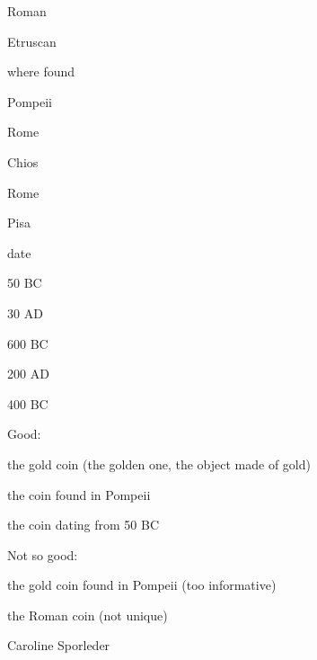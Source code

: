 \documentclass[compress,color=usenames]{beamer}
\begin{document}
\begin{frame}
Roman



Etruscan






where found



Pompeii



Rome



Chios



Rome



Pisa






date



50 BC



30 AD



600 BC



200 AD



400 BC






Good:



the gold coin (the golden one, the object made of gold)



the coin found in Pompeii



the coin dating from 50 BC



Not so good:



the gold coin found in Pompeii (too informative)



the Roman coin (not unique)



Caroline Sporleder














\end{frame}
\end{document}

